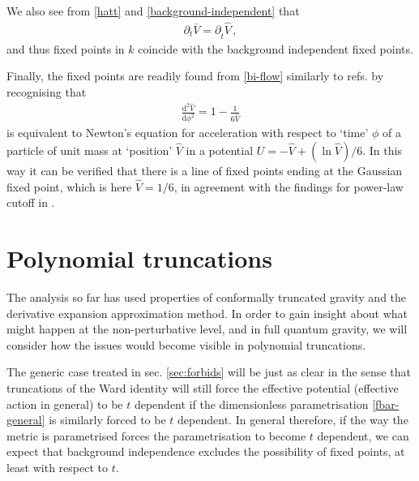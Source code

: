 \documentclass[11pt]{book} %
\newcommand{\bV}{\bar V}
\newcommand{\hV}{\hat V}
\newcommand{\hatt}{\hat t}
\numberwithin{equation}{chapter}
\begin{document}
We also see from \eqref{hatt} and \eqref{background-independent} that
\begin{align}
  \partial_t \bV = \partial_{\hatt} \hV\,,
\end{align}
and thus fixed points in $k$ coincide with the background independent fixed points.

Finally, the fixed points are readily found from \eqref{bi-flow} similarly to refs.
\cite{Dietz:2016gzg,Morris:1994jc} by recognising that
\begin{align}
  \frac{\mathrm d^2\hV}{\mathrm d\phi^2} = 1-\frac{1}{6\hV}
\end{align}
is equivalent to Newton's equation for acceleration with respect to `time' $\phi$ of a particle
of unit mass at `position' $\hV$ in a potential $U=-\hV+ (\ln\hV)/6$.
In this way it can be verified that there is a line of fixed points ending at the Gaussian fixed point,
which is here $\hV=1/6$, in agreement with the findings for power-law cutoff in \cite{Dietz:2016gzg}.


\section{Polynomial truncations}
\label{sec:truncations}

The analysis  so far has used properties of conformally truncated gravity and the derivative
expansion approximation method. In order to gain insight about what might happen at the non-perturbative level,
and in full quantum gravity, we will consider how the issues would become visible in polynomial truncations.

The generic case treated in sec. \ref{sec:forbids} will be just as clear in the sense that truncations
of the Ward identity will still force the effective potential (effective action in general) to be
$t$ dependent if the dimensionless parametrisation \eqref{fbar-general} is similarly forced to be $t$ dependent.
In general therefore, if the way the metric is parametrised forces the parametrisation to become $t$ dependent,
we can expect that background independence excludes the possibility of fixed points,
at least with respect to $t$.
\end{document}
